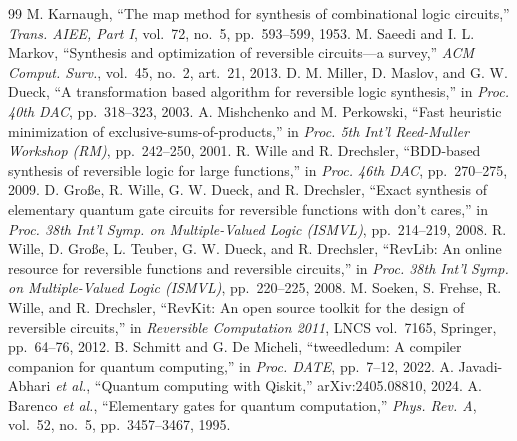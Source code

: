 \documentclass[conference]{IEEEtran}
\theoremstyle{plain}
\begin{document}
\begin{thebibliography}{99}
 M. Karnaugh, ``The map method for synthesis of combinational logic circuits,'' \emph{Trans. AIEE, Part I}, vol.~72, no.~5, pp.~593--599, 1953.
 M. Saeedi and I. L. Markov, ``Synthesis and optimization of reversible circuits---a survey,'' \emph{ACM Comput. Surv.}, vol.~45, no.~2, art.~21, 2013.
 D. M. Miller, D. Maslov, and G. W. Dueck, ``A transformation based algorithm for reversible logic synthesis,'' in \emph{Proc. 40th DAC}, pp.~318--323, 2003.
 A. Mishchenko and M. Perkowski, ``Fast heuristic minimization of exclusive-sums-of-products,'' in \emph{Proc. 5th Int'l Reed-Muller Workshop (RM)}, pp.~242--250, 2001.
 R. Wille and R. Drechsler, ``BDD-based synthesis of reversible logic for large functions,'' in \emph{Proc. 46th DAC}, pp.~270--275, 2009.
 D. Gro{\ss}e, R. Wille, G. W. Dueck, and R. Drechsler, ``Exact synthesis of elementary quantum gate circuits for reversible functions with don't cares,'' in \emph{Proc. 38th Int'l Symp. on Multiple-Valued Logic (ISMVL)}, pp.~214--219, 2008.
 R. Wille, D. Gro{\ss}e, L. Teuber, G. W. Dueck, and R. Drechsler, ``RevLib: An online resource for reversible functions and reversible circuits,'' in \emph{Proc. 38th Int'l Symp. on Multiple-Valued Logic (ISMVL)}, pp.~220--225, 2008.
 M. Soeken, S. Frehse, R. Wille, and R. Drechsler, ``RevKit: An open source toolkit for the design of reversible circuits,'' in \emph{Reversible Computation 2011}, LNCS vol.~7165, Springer, pp.~64--76, 2012.
 B. Schmitt and G. De Micheli, ``tweedledum: A compiler companion for quantum computing,'' in \emph{Proc. DATE}, pp.~7--12, 2022.
 A. Javadi-Abhari \emph{et al.}, ``Quantum computing with Qiskit,'' arXiv:2405.08810, 2024.
 A. Barenco \emph{et al.}, ``Elementary gates for quantum computation,'' \emph{Phys. Rev. A}, vol.~52, no.~5, pp.~3457--3467, 1995.

\end{thebibliography}
\end{document}
